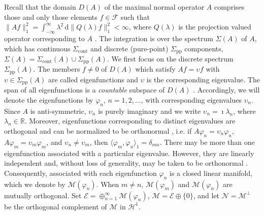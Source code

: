 \documentclass[11pt]{amsart}
\renewcommand{\d}{\mathrm{d}}
\newcommand{\Sigc}{\Sigma_{\text{cont}}}
\newcommand{\Sigp}{\Sigma_{\text{pp}}}
\newcommand{\Hc}{\mathcal{H}}
\newcommand{\Fc}{\mathcal{F}}
\newcommand{\Ec}{\mathcal{E}}
\renewcommand{\Mc}{\mathcal{M}}
\newcommand{\Nc}{\mathcal{N}}
\begin{document}
Recall that the domain $D(A)$ of the maximal normal operator $A$
comprises those and only those elements $f\in\Fc$ such that
$\|Af\|_1^2=\int_{-\infty}^\infty\lambda^2\,\d\|Q(\lambda)f\|_1^2<\infty$, where $Q(\lambda)$ is the
projection valued operator corresponding to $A$ \cite{Stone:64}. The
integration is over the spectrum $\Sigma(A)$ of $A$, which has continuous
$\Sigc$ and discrete (pure-point) $\Sigp$ components,
$\Sigma(A)=\Sigc(A)\cup\Sigp(A)$. We first focus on the discrete spectrum
$\Sigp(A)$. The members $f\neq0$ of $D(A)$ which satisfy $Af=\upsilon f$ with
$\upsilon\in\Sigp(A)$ are called eigenfunctions and $\upsilon$ is the corresponding
eigenvalue. The span of all eigenfunctions is a \emph{countable}
subspace of $D(A)$ \cite{Reed-1980,Stone:64}. Accordingly, we will
denote the eigenfunctions by $\varphi_n$, $n=1,2,\ldots$, with corresponding
eigenvalues $\upsilon_n$. Since $A$ is anti-symmetric, $\upsilon_n$ is purely
imaginary \cite{Stone:64,Horn_Johnson-1990} and we write $\upsilon_n=\imath\lambda_n$,
where $\lambda_n\in\mathbb{R}$.  Moreover, eigenfunctions corresponding to
distinct eigenvalues are orthogonal and can be normalized to be
orthonormal \cite{Stone:64}, i.e. if $A\varphi_n=\upsilon_n\varphi_n$, $A\varphi_m=\upsilon_m\varphi_m$, and
$\upsilon_n\neq\upsilon_m$, then $\langle\varphi_m,\varphi_n\rangle_1=\delta_{mn}$. There may be more than one
eigenfunction associated with a particular eigenvalue. However, they
are linearly independent and, without loss of generality, may be taken
to be orthonormal \cite{Stone:64}. Consequently, associated with each
eigenfunction $\varphi_n$ is a closed linear manifold, which we denote
by $\Mc(\varphi_n)$. When $m\neq n$, $\Mc(\varphi_m)$ and $\Mc(\varphi_n)$ are mutually
orthogonal. Set $\Ec=\oplus_{n=1}^\infty\Mc(\varphi_n)$, $\Mc=\Ec\oplus\{0\}$, and let
$\Nc=\Mc^\perp$ be the orthogonal complement of $\Mc$ in $\Hc^1$.  
\end{document}
